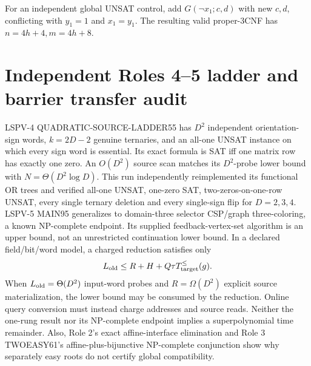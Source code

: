 \documentclass[11pt]{article}
\begin{document}
For an independent global UNSAT control, add $G(\neg x_1;c,d)$ with new $c,d$, conflicting with $y_1=1$ and $x_1=y_1$. The resulting valid proper-3CNF has $n=4h+4,m=4h+8$.

\section{Independent Roles 4--5 ladder and barrier transfer audit}
LSPV-4 QUADRATIC-SOURCE-LADDER55 has $D^2$ independent orientation-sign words, $k=2D-2$ genuine ternaries, and an all-one UNSAT instance on which every sign word is essential. Its exact formula is SAT iff one matrix row has exactly one zero. An $O(D^2)$ source scan matches its $D^2$-probe lower bound with $N=\Theta(D^2\log D)$. This run independently reimplemented its functional OR trees and verified all-one UNSAT, one-zero SAT, two-zeros-on-one-row UNSAT, every single ternary deletion and every single-sign flip for $D=2,3,4$.
LSPV-5 MAIN95 generalizes to domain-three selector CSP/graph three-coloring, a known NP-complete endpoint. Its supplied feedback-vertex-set algorithm is an upper bound, not an unrestricted continuation lower bound. In a declared field/bit/word model, a charged reduction satisfies only
\[
L_{\rm old}\le R+H+Q\tau T_{\rm target}^{\le}(g).
\]
When $L_{\rm old}=\Theta(D^2)$ input-word probes and $R=\Omega(D^2)$ explicit source materialization, the lower bound may be consumed by the reduction. Online query conversion must instead charge addresses and source reads. Neither the one-rung result nor its NP-complete endpoint implies a superpolynomial time remainder. Also, Role 2's exact affine-interface elimination and Role 3 TWOEASY61's affine-plus-bijunctive NP-complete conjunction show why separately easy roots do not certify global compatibility.
\end{document}
